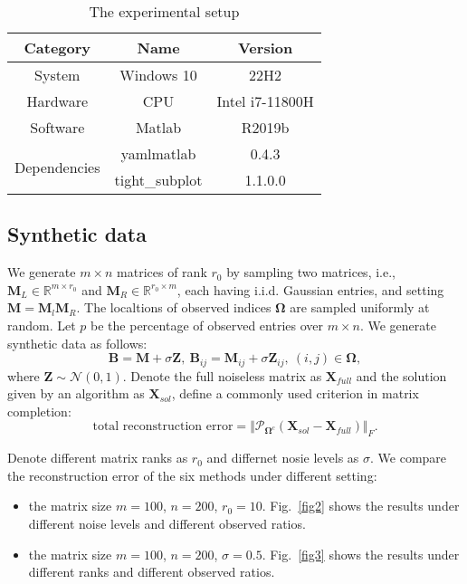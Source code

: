 \documentclass[fontset=windows]{article}
\begin{document}
{\begin{table}[ht]
    \caption{The experimental setup}
    \label{config}
    \centering
    \renewcommand{\arraystretch}{2} 
    \begin{tabular}{ccc}
        \toprule
        Category  & Name &  Version \\
        \midrule
        System & Windows 10 & 22H2 \\
        Hardware & CPU & Intel i7-11800H  \\
        Software & Matlab & R2019b \\
        \multirow{2}{*}{Dependencies} & yamlmatlab\tablefootnote{\url{https://code.google.com/archive/p/yamlmatlab/}}
        & 0.4.3   \\
        & tight\_subplot\tablefootnote{\url{https://www.mathworks.com/matlabcentral/fileexchange/27991-tight_subplot-nh-nw-gap-marg_h-marg_w?s_tid=srchtitle_tight_subplot_1}}
        & 1.1.0.0 \\
        \bottomrule
    \end{tabular}
\end{table}


\subsection{Synthetic data}
We generate $m \times n$ matrices of rank $r_0$ by sampling two matrices, i.e., $\mathbf M_L \in \mathbb{R}^{m \times r_0} $ and $\mathbf M_R \in \mathbb{R}^{r_0 \times m} $, each having i.i.d. Gaussian entries, and setting $\mathbf M=\mathbf M_l \mathbf M_R$. The localtions of observed indices $\mathbf \Omega$ are sampled uniformly at random. Let $p$ be the  percentage of observed entries over $m \times n$. We generate synthetic data as follows:
\begin{equation*}
    \mathbf B = \mathbf M+ \sigma \mathbf Z, \ \mathbf B_{ij} = \mathbf M_{ij} + \sigma \mathbf Z_{ij}, \ (i,j) \in \mathbf \Omega,
\end{equation*}
where $\mathbf Z \sim \mathcal{N} (0,1)$. Denote the full noiseless matrix as $\mathbf X_{full}$ and the solution given by an algorithm as $\mathbf X_{sol}$, define a commonly used criterion in matrix completion:
\begin{equation*}
    \text{total reconstruction error} = \Vert \mathcal{P}_{\mathbf \Omega^c}(\mathbf X_{sol}-\mathbf X_{full})\Vert_F.
\end{equation*}

Denote different matrix ranks as $r_0$ and differnet nosie levels as $\sigma$.
We compare the reconstruction error of the six methods under different setting:
\begin{itemize}
    \item  the matrix size $m =100$, $n=200$, $r_0 = 10$. Fig.~\ref{fig2} shows the results under different noise levels and different observed ratios.
    \item  the matrix size $m =100$, $n=200$, $\sigma = 0.5$. Fig.~\ref{fig3} shows the results under different ranks and different observed ratios.
\end{itemize}

}
\end{document}

